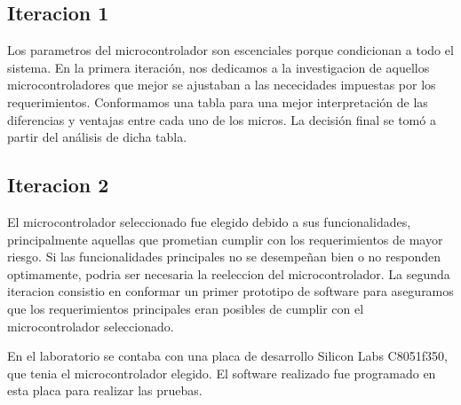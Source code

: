 \subsection{Iteracion 1} %
\label{sub:iteracion_1}

Los parametros del microcontrolador son escenciales porque condicionan a todo el sistema. En la primera iteración, nos dedicamos a la investigacion de aquellos microcontroladores que mejor se ajustaban a las nececidades impuestas por los requerimientos. Conformamos una tabla para una mejor interpretación de las diferencias y ventajas entre cada uno de los micros. La decisión final se tomó a partir del análisis de dicha tabla.



\subsection{Iteracion 2} %
\label{sub:iteracion_2}

El microcontrolador seleccionado fue elegido debido a sus funcionalidades, principalmente aquellas que prometian cumplir con los requerimientos de mayor riesgo. Si las funcionalidades principales no se desempeñan bien o no responden optimamente, podria ser necesaria la reeleccion del microcontrolador. La segunda iteracion consistio en conformar un primer prototipo de software para aseguramos que los requerimientos principales eran posibles de cumplir con el microcontrolador seleccionado.

En el laboratorio se contaba con una placa de desarrollo Silicon Labs C8051f350, que tenia el microcontrolador elegido. El software realizado fue programado en esta placa para realizar las pruebas.


